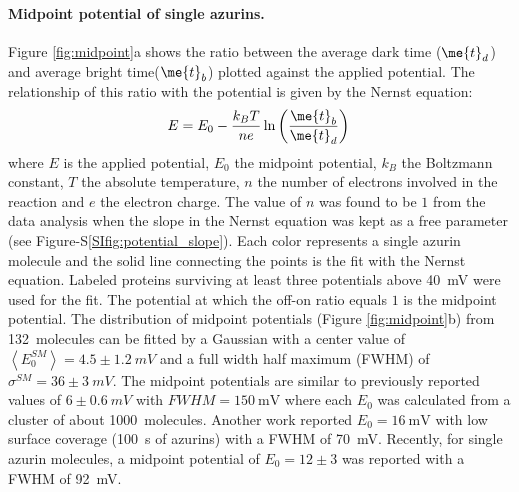 \paragraph*{Midpoint potential of single azurins.}
Figure \ref{fig:midpoint}a shows the ratio between the average dark time ($\me{t}_{d}$) and average bright time($\me{t}_{b}$) plotted against the applied potential.
The relationship of this ratio with the potential is given by the Nernst equation: 
\begin{equation}
	E = E_0 - \frac{k_BT}{n e}\ln\left(\frac{\me{t}_{b}}{\me{t}_{d}}\right)\,
	\label{eq:nernst}
\end{equation}
where $E$ is the applied potential, $E_0$ the midpoint potential, $k_B$ the Boltzmann constant, $T$ the absolute temperature, $n$ the number of electrons involved in the reaction and $e$ the electron charge.
The value of $n$ was found to be $1$ from the data analysis when the slope in the Nernst equation was kept as a free parameter (see Figure-S\ref{SIfig:potential_slope}).
Each color represents a single azurin molecule and the solid line connecting the points is the fit with the Nernst equation.
Labeled proteins surviving at least three potentials above \SI{40}{\mV} were used for the fit.
The potential at which the off-on ratio equals $1$ is the midpoint potential.
The distribution of midpoint potentials (Figure \ref{fig:midpoint}b) from \SI{132}{ molecules} can be fitted by a Gaussian with a center value of $\left<E_0^{SM}\right>=4.5 \pm 1.2~mV$ and a full width half maximum (FWHM) of $\sigma^{SM}=36 \pm 3~mV$. 
The midpoint potentials are similar to previously reported values of $6\pm0.6~mV$ with $FWHM=\SI{150}{\mV}$ where each $E_0$ was calculated from a cluster of about \SI{1000}{ molecules}.\cite{davis2006monitoring}
Another work reported $E_0 = \SI{16}{\mV}$ with low surface coverage (\SI{100}{\s} of azurins) with a FWHM of \SI{70}{\mV}.\cite{salverda2010fluorescent} 
Recently, for single azurin molecules, a midpoint potential of $E_0=12\pm3$ was reported with a FWHM of \SI{92}{\mV}.\cite{akkilic2014chemically-induced}\\

